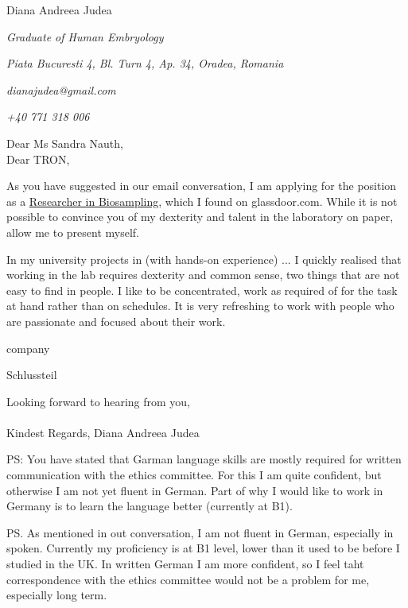 \documentclass[paper=a4,fontsize=11pt]{scrartcl} %
\newcommand{\sepspace}{\vspace*{1em}}		%
\newcommand{\MyName}[1]{ %
  \Huge \usefont{OT1}{phv}{b}{n} \hfill #1
  \par \normalsize \normalfont}
\newcommand{\MySlogan}[4]{ %
  \large \usefont{OT1}{phv}{m}{n}\hfill \textit{#1} 
  \sepspace
  \par \normalsize \usefont{OT1}{phv}{m}{n}\hfill \textit{#2}
  \par \normalsize \usefont{OT1}{phv}{m}{n}\hfill \textit{#3}
  \par \normalsize \usefont{OT1}{phv}{m}{n}\hfill \textit{#4}
  \par \normalsize \normalfont}
\begin{document}
  
  \MyName{Diana Andreea Judea}
  \MySlogan{Graduate of Human Embryology}{Piata Bucuresti 4, Bl. Turn 4, Ap. 34, Oradea, Romania}{dianajudea@gmail.com}{+40 771 318 006}
  \sepspace \sepspace
  
  \noindent
  Dear Ms Sandra Nauth, \\
  Dear TRON,

  \sepspace
  
  \noindent 
  As you have suggested in our email conversation, I am applying for the
  position as a
  \href{https://tron-mainz.de/wp-content/uploads/2021/03/Research_Scientist_Biosampling.pdf}{Researcher
  in Biosampling}, which I found on glassdoor.com.  While it is not possible to
  convince you of my dexterity and talent in the laboratory on paper, allow me to
  present myself.
  \sepspace
  
  \noindent
  In my university projects in (with hands-on experience) ... I quickly
  realised that working in the lab requires dexterity and common sense, two
  things that are not easy to find in people.  I like to be concentrated, work
  as required of for the task at hand rather than on schedules.  It is very
  refreshing to work with people who are passionate and focused about their
  work.
  \sepspace
  
  \noindent
  company
  \sepspace
  
  \noindent
  Schlussteil
  \sepspace
  
  \noindent
  Looking forward to hearing from you, \\\\
  Kindest Regards,
  Diana Andreea Judea
  \sepspace
  
  \noindent
  PS: You have stated that Garman language skills are mostly required for
  written communication with the ethics committee.  For this I am quite
  confident, but otherwise I am not yet fluent in German.  Part of why I would
  like to work in Germany is to learn the language better (currently at B1).
  \sepspace

  \noindent
  PS. As mentioned in out conversation, I am not fluent in German, especially
  in spoken.  Currently my proficiency is at B1 level, lower than it used to be
  before I studied in the UK.  In written German I am more confident, so I feel
  taht correspondence with the ethics committee would not be a problem for me,
  especially long term.
  \sepspace

  \vspace*{\fill}
  
\end{document}
